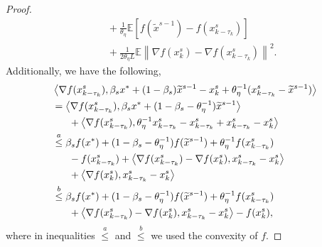 \documentclass[conference]{IEEEtran}
\newcommand*{\E}{\mathbb{E}}
\newcommand{\norm}[1]{\left\lVert#1\right\rVert}
\newcommand{\Iprod}[2]{\left\langle #1,#2\right\rangle}
\theoremstyle{definition}
\theoremstyle{remark}
\begin{document}
\begin{proof}
\begin{equation}
\begin{split}
&~~~+\frac{1}{\theta_{\eta}}\E\left[f(\widetilde{x}^{s-1})-f({x}_{k-\tau_k}^{s})\right]\\
&~~~+{\frac{1}{2 \theta_{\eta} L} \E\norm{\nabla f(x_{k}^s)-\nabla f(x_{k-\tau_k}^s)}^2}.
\end{split}
\end{equation}
Additionally, we have the following,
\begin{equation}\label{Eq4-Lemma1}
\begin{split}
&\Iprod{\nabla f(x_{k-\tau_k}^s)}{\beta_sx^*+(1-\beta_s)\widetilde{x}^{s-1}-{x}^{s}_{k}+\theta_{\eta}^{-1}(x_{k-\tau_k}^s-\widetilde{x}^{s-1})}\\
&=\Iprod{\nabla f(x_{k-\tau_k}^s)}{\beta_sx^*+(1-\beta_s-\theta_{\eta}^{-1})\widetilde{x}^{s-1}}\\
&~~~~~+\Iprod{\nabla f(x_{k-\tau_k}^s)}{\theta_{\eta}^{-1}x_{k-\tau_k}^s-x_{k-\tau_k}^s+x_{k-\tau_k}^s-{x}^{s}_{k}}\\
&\stackrel{a}{\leq} \beta_sf(x^*)+(1-\beta_s-\theta_{\eta}^{-1})f(\widetilde{x}^{s-1})+\theta_{\eta}^{-1}f(x_{k-\tau_k}^s)\\
&~~~~~-f(x_{k-\tau_k}^s)+\Iprod{\nabla f(x_{k-\tau_k}^s)-\nabla f(x_{k}^s)}{x_{k-\tau_k}^s-{x}^{s}_{k}}\\
&~~~~~+\Iprod{\nabla f(x_{k}^s)}{x_{k-\tau_k}^s-{x}^{s}_{k}}\\
&\stackrel{b}{\leq} \beta_sf(x^*)+(1-\beta_s-\theta_{\eta}^{-1})f(\widetilde{x}^{s-1})+\theta_{\eta}^{-1}f(x_{k-\tau_k}^s)\\
&~~~~~+\Iprod{\nabla f(x_{k-\tau_k}^s)-\nabla f(x_{k}^s)}{x_{k-\tau_k}^s-{x}^{s}_{k}}- f(x_{k}^s),
\end{split}
\raisetag{15pt}
\end{equation}
where in inequalities $\stackrel{a}{\leq}$ and $\stackrel{b}{\leq}$ we used the convexity of $f$. 


\end{proof}
\end{document}
